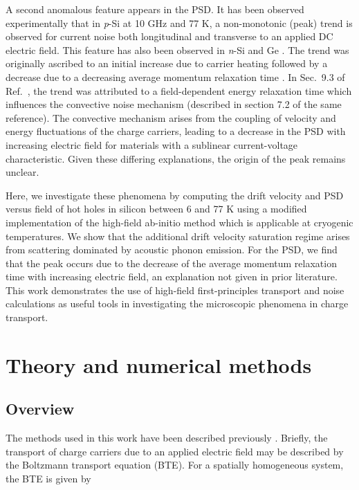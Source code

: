 \documentclass[aps,prx,preprint,letterpaper,groupedaddress,longbibliography]{revtex4-2}
\theoremstyle{definition}
\begin{document}
A second anomalous feature appears in the PSD. It has been observed experimentally that in \textit{p}-Si at 10 GHz and 77 K, a non-monotonic (peak) trend is observed for current noise both longitudinal and transverse to an applied DC electric field. This feature has also been observed in \textit{n}-Si and Ge \cite{Bareikis:1980,Bareikis:1981}. The trend was originally ascribed to an initial increase due to carrier heating followed by a decrease due to a decreasing average momentum relaxation time \cite{Bareikis:1981}. In Sec.~9.3 of Ref.~\cite{Hartnagel:2001}, the trend was attributed to a field-dependent energy relaxation time which influences the convective noise mechanism (described in section 7.2 of the same reference). The convective mechanism arises from the coupling of velocity and energy fluctuations of the charge carriers, leading to a decrease in the PSD with increasing electric field for materials with 
a sublinear current-voltage characteristic. Given these differing explanations, the origin of the peak remains unclear.

Here, we investigate these phenomena by computing the drift velocity and PSD versus field of hot holes in silicon between 6 and 77 K using a modified implementation of the high-field ab-initio method which is applicable at cryogenic temperatures. We show that the additional drift velocity saturation regime arises from scattering dominated by acoustic phonon emission. For the PSD, we find that the peak occurs due to the decrease of the average momentum relaxation time with increasing electric field, an explanation not given in prior literature. This work demonstrates the use of high-field first-principles transport and noise calculations as useful tools in investigating the microscopic phenomena in charge transport.

\section{Theory and numerical methods}

\subsection{Overview}

The methods used in this work have been described previously \cite{Choi:2021, Cheng:2022, Catherall:2022}. Briefly, the transport of charge carriers due to an applied electric field may be described by the Boltzmann transport equation (BTE). For a spatially homogeneous system, the BTE is given by
\end{document}
